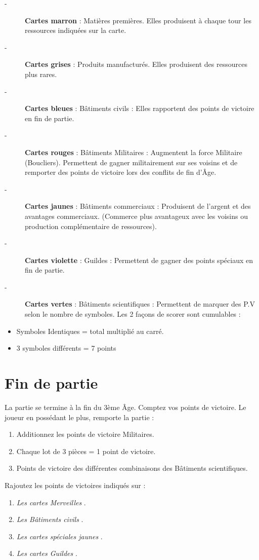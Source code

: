 \documentclass{article}%
\begin{document}
%
\begin{description}%
\item[{-} ]%
%
\textbf{Cartes marron}%
\textit{ }%
 : Matières premières. Elles produisent à chaque tour les ressources indiquées sur la carte.
%
\item[{-} ]%
%
\textbf{Cartes grises}%
\textit{ }%
 : Produits manufacturés. Elles produisent des ressources plus rares.
%
\item[{-} ]%
%
\textbf{Cartes bleues}%
\textit{ }%
 : Bâtiments civils : Elles rapportent des points de victoire en fin de partie.
%
\item[{-} ]%
%
\textbf{Cartes rouges}%
\textit{ }%
 : Bâtiments Militaires : Augmentent la force Militaire (Boucliers). Permettent de gagner militairement sur ses voisins et de remporter des points de victoire lors des conflits de fin d’Âge.
%
\item[{-} ]%
%
\textbf{Cartes jaunes}%
\textit{ }%
 : Bâtiments commerciaux : Produisent de l’argent et des avantages commerciaux. (Commerce plus avantageux avec les voisins ou production complémentaire de ressources).
%
\item[{-} ]%
%
\textbf{Cartes violette}%
\textit{ }%
 : Guildes : Permettent de gagner des points spéciaux en fin de partie.
%
\item[{-} ]%
%
\textbf{Cartes vertes}%
\textit{ }%
 : Bâtiments scientifiques : Permettent de marquer des P.V selon le nombre de symboles. Les 2 façons de scorer sont cumulables :
%
\end{description}%
\begin{itemize}%
\item%
%
 Symboles Identiques = total multiplié au carré.
%
\item%
%
 3 symboles différents = 7 points
%
\end{itemize}

%
\section{ Fin de partie
}%
\label{sec:Findepartie}%
La partie se termine à la fin du 3ème Âge. Comptez vos points de victoire. Le joueur en possédant le plus, remporte la partie :
%
\begin{enumerate}%
\item%
%
 Additionnez les points de victoire Militaires.
%
\item%
%
 Chaque lot de 3 pièces = 1 point de victoire.
%
\item%
%
 Points de victoire des différentes combinaisons des Bâtiments scientifiques.
%
\end{enumerate}%
Rajoutez les points de victoires indiqués sur :
%
\begin{enumerate}%
\item%
%
\textit{Les cartes Merveilles}%
.
%
\item%
%
\textit{Les Bâtiments civils}%
. 
%
\item%
%
\textit{Les cartes spéciales jaunes}%
.
%
\item%
%
\textit{Les cartes Guildes}%
.%
\end{enumerate}

%
\end{document}
